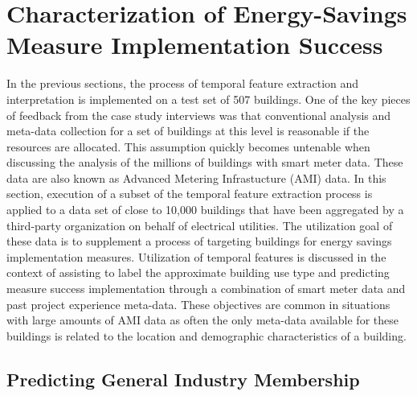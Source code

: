 \chapter{Characterization of Energy-Savings Measure Implementation Success}
\label{sec:scalability}

In the previous sections, the process of temporal feature extraction and interpretation is implemented on a test set of 507 buildings. One of the key pieces of feedback from the case study interviews was that conventional analysis and meta-data collection for a set of buildings at this level is reasonable if the resources are allocated. This assumption quickly becomes untenable when discussing the analysis of the millions of buildings with smart meter data. These data are also known as Advanced Metering Infrastucture (AMI) data.  In this section, execution of a subset of the temporal feature extraction process is applied to a data set of close to 10,000 buildings that have been aggregated by a third-party organization on behalf of electrical utilities. The utilization goal of these data is to supplement a process of targeting buildings for energy savings implementation measures. Utilization of temporal features is discussed in the context of assisting to label the approximate building use type and predicting measure success implementation through a combination of smart meter data and past project experience meta-data. These objectives are common in situations with large amounts of AMI data as often the only meta-data available for these buildings is related to the location and demographic characteristics of a building. 




\section{Predicting General Industry Membership}
\label{sec:predictinsiccode}

